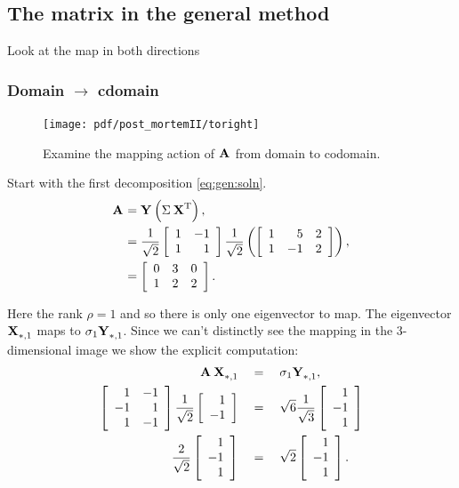 \subsection{The matrix in the general method}
Look at the map in both directions

\subsubsection{Domain $\longrightarrow$ cdomain}
\begin{figure}[htbp] %
   \centering
   \texttt{[image: pdf/post\_mortemII/toright]} 
   \caption{Examine the mapping action of $\A{}$ from domain to codomain.}
   \label{fig:toright}
\end{figure}

Start with the first decomposition \eqref{eq:gen:soln}.
\begin{equation}
  \begin{split}
    \A{} &= \Y{}\paren{\sig{}\,\X{T}},\\
     &=
  \frac{1}{\sqrt{2}}
  \mat{rr}{1 & -1\\1 & 1}
  \frac{1}{\sqrt{2}}
  \paren{
  \mat{crc}
  {
  1 & 5  & 2 \\
  1 & -1 & 2
  }}, \\
  &=
  \mat{ccc}
  {
  0 & 3 & 0 \\
  1 & 2 & 2
  }.
  \end{split}
  \label{eq:gen:soln}
\end{equation}

Here the rank $\rho=1$ and so there is only one eigenvector to map. The eigenvector $\X{}_{*,1}$ maps to $\sigma_{1}\Y{}_{*,1}$. Since we can't distinctly see the mapping in the 3-dimensional image we show the explicit computation:
\begin{equation}
  \begin{split}
    \A{}\,\X{}_{*,1}\quad &= \quad \sigma_{1}\Y{}_{*,1}, \\
    \Aexample \frac{1}{\sqrt{2}}\mat{r}{1\\-1} \quad & =  \quad \sqrt{6}\frac{1}{\sqrt{3}}\mat{r}{1\\-1\\1}\\
    \frac{2}{\sqrt{2}}\mat{r}{1\\-1\\1}  \quad & =  \quad \sqrt{2}\mat{r}{1\\-1\\1}.
  \end{split}
\end{equation}

